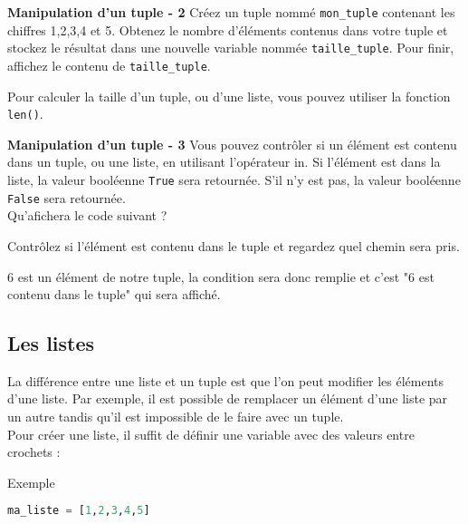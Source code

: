     \begin{Exercice}[5 minutes] \textbf{Manipulation d'un tuple - 2}
        Créez un tuple nommé \lstinline{mon_tuple} contenant les chiffres 1,2,3,4 et 5. Obtenez le nombre d'éléments contenus dans votre tuple et stockez le résultat dans une nouvelle variable nommée \lstinline{taille_tuple}. Pour finir, affichez le contenu de \lstinline{taille_tuple}.
    
        \begin{conseil}
            Pour calculer la taille d'un tuple, ou d'une liste, vous pouvez utiliser la fonction \lstinline{len()}.
        \end{conseil}
        
        \begin{solution}
             
        \end{solution}
    \end{Exercice}
    
    \begin{Exercice}[5 minutes] \textbf{Manipulation d'un tuple - 3}
        Vous pouvez contrôler si un élément est contenu dans un tuple, ou une liste, en utilisant l'opérateur in. Si l'élément est dans la liste, la valeur booléenne \lstinline{True} sera retournée. S'il n'y est pas, la valeur booléenne \lstinline{False} sera retournée. \\
        
        Qu'afichera le code suivant ? \\
        
        
    
        \begin{conseil}
            Contrôlez si l'élément est contenu dans le tuple et regardez quel chemin sera pris.
        \end{conseil}
        
        \begin{solution}
            6 est un élément de notre tuple, la condition sera donc remplie et c'est "6 est contenu dans le tuple" qui sera affiché.
        \end{solution}
    \end{Exercice}
    
    \subsection{Les listes}
    La différence entre une liste et un tuple est que l'on peut modifier les éléments d'une liste. Par exemple, il est possible de remplacer un élément d'une liste par un autre tandis qu'il est impossible de le faire avec un tuple.
    \\
    Pour créer une liste, il suffit de définir une variable avec des valeurs entre crochets :
    \begin{Example}{\faTerminal \quad Exemple}
        \begin{lstlisting}[language=Python]
            ma_liste = [1,2,3,4,5]   \end{lstlisting}
    \end{Example}
    
